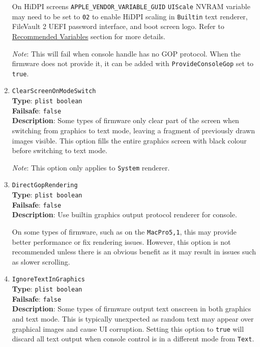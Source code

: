 \documentclass[]{article}
\begin{document}
\begin{enumerate}
  On HiDPI screens \texttt{APPLE\_VENDOR\_VARIABLE\_GUID} \texttt{UIScale}
  NVRAM variable may need to be set to \texttt{02} to enable HiDPI scaling
  in \texttt{Builtin} text renderer, FileVault 2 UEFI password interface,
  and boot screen logo. Refer to \hyperref[nvramvarsrec]{Recommended Variables}
  section for more details.

  \emph{Note}: This will fail when console handle has no GOP protocol. When
  the firmware does not provide it, it can be added with \texttt{ProvideConsoleGop}
  set to \texttt{true}.

\item
  \texttt{ClearScreenOnModeSwitch}\\
  \textbf{Type}: \texttt{plist\ boolean}\\
  \textbf{Failsafe}: \texttt{false}\\
  \textbf{Description}: Some types of firmware only clear part of the screen when switching
  from graphics to text mode, leaving a fragment of previously drawn images visible.
  This option fills the entire graphics screen with black colour before switching to
  text mode.

  \emph{Note}: This option only applies to \texttt{System} renderer.

\item
  \texttt{DirectGopRendering}\\
  \textbf{Type}: \texttt{plist\ boolean}\\
  \textbf{Failsafe}: \texttt{false}\\
  \textbf{Description}: Use builtin graphics output protocol renderer for console.

  On some types of firmware, such as on the \texttt{MacPro5,1}, this may provide better
  performance or fix rendering issues. However, this option is not recommended unless
  there is an obvious benefit as it may result in issues such as slower scrolling.

\item
  \texttt{IgnoreTextInGraphics}\\
  \textbf{Type}: \texttt{plist\ boolean}\\
  \textbf{Failsafe}: \texttt{false}\\
  \textbf{Description}: Some types of firmware output text onscreen in both graphics and
  text mode. This is typically unexpected as random text may appear over
  graphical images and cause UI corruption. Setting this option to \texttt{true} will
  discard all text output when console control is in a different mode from \texttt{Text}.


\end{enumerate}
\end{document}
